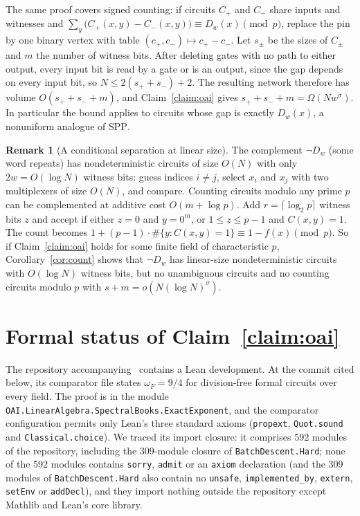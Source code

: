 \documentclass[11pt]{article}
\theoremstyle{definition}
\newtheorem{remark}[theorem]{Remark}
\newcommand{\Dw}{D_w}
\begin{document}
The same proof covers signed counting: if circuits $C_+$ and $C_-$ share inputs and witnesses and $\sum_y\bigl(C_+(x,y)-C_-(x,y)\bigr)\equiv\Dw(x)\pmod p$, replace the pin by one binary vertex with table $(c_+,c_-)\mapsto c_+-c_-$. Let $s_\pm$ be the sizes of $C_\pm$ and $m$ the number of witness bits. After deleting gates with no path to either output, every input bit is read by a gate or is an output, since the gap depends on every input bit, so $N\le 2(s_++s_-)+2$. The resulting network therefore has volume $O(s_++s_-+m)$, and Claim~\ref{claim:oai} gives $s_++s_-+m=\Omega(N w^{\sigma})$. In particular the bound applies to circuits whose gap is exactly $\Dw(x)$, a nonuniform analogue of $\mathrm{SPP}$.

\begin{remark}[A conditional separation at linear size]\label{rem:sep}
The complement $\neg\Dw$ (some word repeats) has nondeterministic circuits of size $O(N)$ with only $2w = O(\log N)$ witness bits: guess indices $i\neq j$, select $x_i$ and $x_j$ with two multiplexers of size $O(N)$, and compare. Counting circuits modulo any prime $p$ can be complemented at additive cost $O(m+\log p)$. Add $r=\lceil\log_2 p\rceil$ witness bits $z$ and accept if either $z=0$ and $y=0^m$, or $1\le z\le p-1$ and $C(x,y)=1$. The count becomes $1+(p-1)\cdot\#\{y:C(x,y)=1\}\equiv 1-f(x)\pmod p$. So if Claim~\ref{claim:oai} holds for some finite field of characteristic $p$, Corollary~\ref{cor:count} shows that $\neg\Dw$ has linear-size nondeterministic circuits with $O(\log N)$ witness bits, but no unambiguous circuits and no counting circuits modulo $p$ with $s+m=o(N(\log N)^{\sigma})$.
\end{remark}

\section{Formal status of Claim~\ref{claim:oai}}\label{sec:lean}

The repository accompanying~\cite{OAI-MM} contains a Lean development. At the commit cited below, its comparator file  states $\omega_F = 9/4$ for division-free formal circuits over every field. The proof is in the module \texttt{OAI.\allowbreak LinearAlgebra.\allowbreak SpectralBooks.\allowbreak ExactExponent}, and the comparator configuration permits only Lean's three standard axioms (\texttt{propext}, \texttt{Quot.sound} and \texttt{Classical.choice}). We traced its import closure: it comprises 592 modules of the repository, including the 309-module closure of \texttt{BatchDescent.Hard}; none of the 592 modules contains \texttt{sorry}, \texttt{admit} or an \texttt{axiom} declaration (and the 309 modules of \texttt{BatchDescent.Hard} also contain no \texttt{unsafe}, \texttt{implemented\_by}, \texttt{extern}, \texttt{setEnv} or \texttt{addDecl}), and they import nothing outside the repository except Mathlib and Lean's core library.
\end{document}
